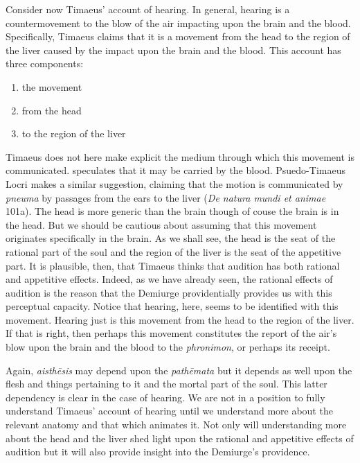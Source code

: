 Consider now Timaeus' account of hearing. In general, hearing is a countermovement to the blow of the air impacting upon the brain and the blood. Specifically, Timaeus claims that it is a movement from the head to the region of the liver caused by the impact upon the brain and the blood. This account has three components:
\begin{enumerate}
	\item the movement
	\item from the head
	\item to the region of the liver
\end{enumerate}
Timaeus does not here make explicit the medium through which this movement is communicated. \citealt[477]{Taylor:1928qb} speculates that it may be carried by the blood. Psuedo-Timaeus Locri makes a similar suggestion, claiming that the motion is communicated by \emph{pneuma} by passages from the ears to the liver (\emph{De natura mundi et animae} 101a). The head is more generic than the brain though of couse the brain is in the head. But we should be cautious about assuming that this movement originates specifically in the brain. As we shall see, the head is the seat of the rational part of the soul and the region of the liver is the seat of the appetitive part. It is plausible, then, that Timaeus thinks that audition has both rational and appetitive effects. Indeed, as we have already seen, the rational effects of audition is the reason that the Demiurge providentially provides us with this perceptual capacity. Notice that hearing, here, seems to be identified with this movement. Hearing just is this movement from the head to the region of the liver. If that is right, then perhaps this movement constitutes the report of the air's blow upon the brain and the blood to the \emph{phronimon}, or perhaps its receipt.

Again, \emph{aisthēsis} may depend upon the \emph{pathēmata} but it depends as well upon the flesh and things pertaining to it and the mortal part of the soul. This latter dependency is clear in the case of hearing. We are not in a position to fully understand Timaeus' account of hearing until we understand more about the relevant anatomy and that which animates it. Not only will understanding more about the head and the liver shed light upon the rational and appetitive effects of audition but it will also provide insight into the Demiurge's providence.

